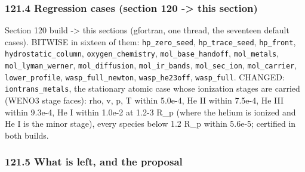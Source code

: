 \documentclass[english,a4paper]{my_memo}
\begin{document}
\subsubsection{121.4 Regression cases (section 120 -\textgreater{} this section)}\label{1214-regression-cases-section-120---this-section}

Section 120 build -\textgreater{} this section\textquotesingle s (gfortran, one thread, the seventeen
default cases). BITWISE in sixteen of them: \texttt{hp\_zero\_seed}, \texttt{hp\_trace\_seed}, \texttt{hp\_front},
\texttt{hydrostatic\_column}, \texttt{oxygen\_chemistry}, \texttt{mol\_base\_handoff}, \texttt{mol\_metals},
\texttt{mol\_lyman\_werner}, \texttt{mol\_diffusion}, \texttt{mol\_ir\_bands}, \texttt{mol\_sec\_ion},
\texttt{mol\_carrier}, \texttt{lower\_profile}, \texttt{wasp\_full\_newton}, \texttt{wasp\_he23off},
\texttt{wasp\_full}. CHANGED: \texttt{iontrans\_metals}, the stationary atomic case
whose ionization stages are carried (WENO3 stage faces): rho, v, p, T within
5.0e-4, He II within 7.5e-4, He III within 9.3e-4, He I within 1.0e-2 at
1.2-3 R\_p (where the helium is ionized and He I is the minor stage), every
species below 1.2 R\_p within 5.6e-5; certified in both builds.

\subsubsection{121.5 What is left, and the proposal}\label{1215-what-is-left-and-the-proposal}
\end{document}
